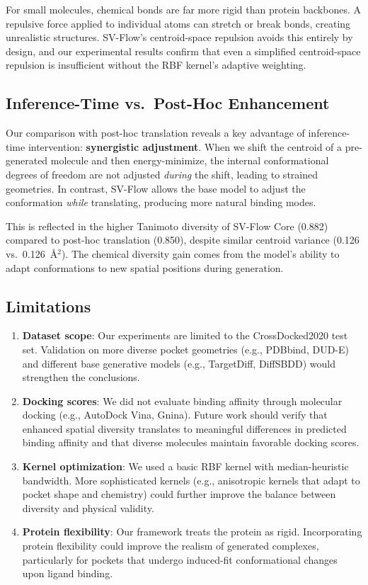 \documentclass[a4paper,11pt]{article}
\begin{document}
For small molecules, chemical bonds are far more rigid than protein backbones.  A
repulsive force applied to individual atoms can stretch or break bonds, creating
unrealistic structures.  SV-Flow's centroid-space repulsion avoids this entirely
by design, and our experimental results confirm that even a simplified
centroid-space repulsion is insufficient without the RBF kernel's adaptive
weighting.

\subsection{Inference-Time vs.\ Post-Hoc Enhancement}

Our comparison with post-hoc translation reveals a key advantage of
inference-time intervention: \textbf{synergistic adjustment}.  When we shift the
centroid of a pre-generated molecule and then energy-minimize, the internal
conformational degrees of freedom are not adjusted \emph{during} the shift,
leading to strained geometries.  In contrast, SV-Flow allows the base model to
adjust the conformation \emph{while} translating, producing more natural binding
modes.

This is reflected in the higher Tanimoto diversity of SV-Flow Core (0.882)
compared to post-hoc translation (0.850), despite similar centroid variance
(0.126 vs.\ 0.126~\AA$^2$).  The chemical diversity gain comes from the model's
ability to adapt conformations to new spatial positions during generation.

\subsection{Limitations}

\begin{enumerate}
  \item \textbf{Dataset scope}: Our experiments are limited to the CrossDocked2020
    test set.  Validation on more diverse pocket geometries (e.g., PDBbind,
    DUD-E) and different base generative models (e.g., TargetDiff, DiffSBDD)
    would strengthen the conclusions.
  \item \textbf{Docking scores}: We did not evaluate binding affinity through
    molecular docking (e.g., AutoDock Vina, Gnina).  Future work should verify
    that enhanced spatial diversity translates to meaningful differences in
    predicted binding affinity and that diverse molecules maintain favorable
    docking scores.
  \item \textbf{Kernel optimization}: We used a basic RBF kernel with
    median-heuristic bandwidth.  More sophisticated kernels (e.g., anisotropic
    kernels that adapt to pocket shape and chemistry) could further improve the
    balance between diversity and physical validity.
  \item \textbf{Protein flexibility}: Our framework treats the protein as rigid.
    Incorporating protein flexibility could improve the realism of generated
    complexes, particularly for pockets that undergo induced-fit conformational
    changes upon ligand binding.
\end{enumerate}
\end{document}
